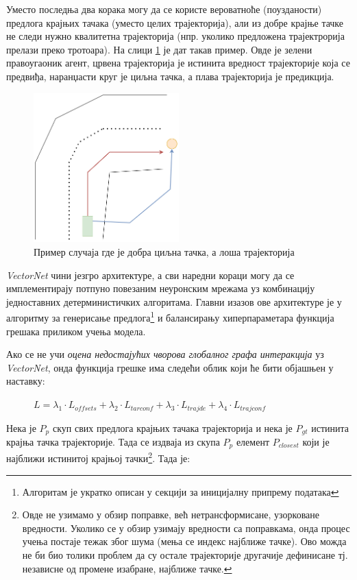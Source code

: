 \documentclass[11pt,oneside]{memoir}
\begin{document}
Уместо последња два корака могу да се користе вероватноће (поузданости) предлога крајњих тачака (уместо целих трајекторија),
али из добре крајње тачке не следи
нужно квалитетна трајекторија (нпр. уколико предложена трајектрорија прелази преко тротоара). На слици \ref{tnt-good-target-bad-traj}
је дат такав пример. Овде је зелени правоугаоник агент, црвена трајекторија је истинита вредност трајекторије која се предвиђа, 
наранџасти круг је циљна тачка, а плава трајекторија је предикција. 

\begin{figure}[H]
  \centering
  \includegraphics[width=0.5\textwidth]{images/tnt-good-end-point-and-bad-traj.drawio.png}
  \caption{Пример случаја где је добра циљна тачка, а лоша трајекторија \label{tnt-good-target-bad-traj}}
\end{figure}

\textit{VectorNet} чини језгро архитектуре, а сви наредни кораци могу да се имплементирају потпуно повезаним неуронским мрежама уз комбинацију
једноставних детерминистичких алгоритама. Главни изазов ове архитектуре је у алгоритму за генерисање 
предлога\footnote{Алгоритам је укратко описан у секцији за иницијалну припрему података} и балансирању
хиперпараметара функција грешака приликом учења модела.

Ако се не учи \textit{оцена недостајућих чворова глобалног графа интеракција} уз \textit{VectorNet},
онда функција грешке има следећи облик који ће бити објашњен у наставку:

\begin{figure}[H]
  \centering
  $L = \lambda_{1} \cdot L_{offsets} + \lambda_{2} \cdot L_{tarconf} + \lambda_{3} \cdot L_{trajde} + \lambda_{4} \cdot L_{trajconf}$
\end{figure}

Нека је $P_{p}$ скуп свих предлога крајњих тачака трајекторија и нека је $P_{gt}$ истинита крајња тачка трајекторије. Тада се издваја
из скупа $P_{p}$ елемент $P_{closest}$ који је најближи истинитој крајњој тачки\footnote{Овде не узимамо у обзир поправке,
већ нетрансформисане, узорковане вредности. 
Уколико се у обзир узимају вредности са поправкама, онда процес учења постаје тежак због шума (мења се индекс најближе тачке). Ово можда не би био
толики проблем да су остале трајекторије другачије дефинисане тј. независне од промене изабране, најближе тачке.}. 
Тада је:
\end{document}
